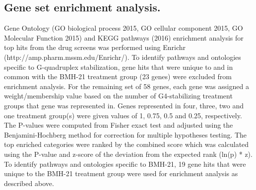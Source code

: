 \subsection{Gene set enrichment analysis.}
Gene Ontology (GO biological process 2015, GO cellular component 2015, GO Molecular Function 2015) and KEGG pathways (2016) enrichment analysis for top hits from the drug screens was performed using Enrichr (http://amp.pharm.mssm.edu/Enrichr/)\cite{Chen2013,Kuleshov2016}. To identify pathways and ontologies specific to G-quadruplex stabilization, gene hits that were unique to and in common with the BMH-21 treatment group (23 genes) were excluded from enrichment analysis. For the remaining set of 58 genes, each gene was assigned a weight/membership value based on the number of G4-stabilizing treatment groups that gene was represented in. Genes represented in four, three, two and one treatment group(s) were given values of 1, 0.75, 0.5 and 0.25, respectively. The P-values were computed from Fisher exact test and adjusted using the Benjamini-Hochberg method for correction for multiple hypotheses testing. The top enriched categories were ranked by the combined score which was calculated using the P-value and z-score of the deviation from the expected rank (ln(p) * z). To identify pathways and ontologies specific to BMH-21, 19 gene hits that were unique to the BMH-21 treatment group were used for enrichment analysis as described above.

